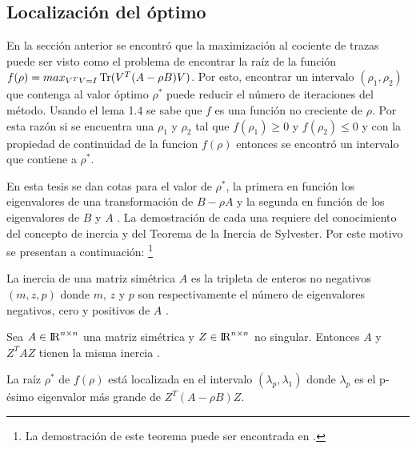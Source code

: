 \subsection{Localización del óptimo}

En la sección anterior se encontró que la maximización al cociente de trazas puede ser visto como el problema de encontrar la raíz de la función $f(\rho) = max_{V^T V= I} \operatorname{Tr}(V^T(A-\rho B)V)$. Por esto, encontrar un intervalo $(\rho_1, \rho_2)$ que contenga al valor óptimo $\rho^*$ puede reducir el número de iteraciones del método. Usando el lema 1.4 se sabe que $f$ es una función no creciente de $\rho$. Por esta razón si se encuentra una $\rho_1$ y $\rho_2$ tal que $f(\rho_1) \geq 0$ y $f(\rho_2) \leq 0$ y con la propiedad de continuidad de la funcion $f(\rho)$ entonces se encontró un intervalo que contiene a $\rho^*$. 

En esta tesis se dan cotas para el valor de $\rho^*$, la primera en función los eigenvalores de una transformación de $B -\rho A$ y la segunda en función de los eigenvalores de $B$ y $A$ \cite{ngo2012trace}. La demostración de cada una requiere del conocimiento del concepto de inercia y del Teorema de la Inercia de Sylvester. Por este motivo se presentan a continuación: \footnote{La demostración de este teorema puede ser encontrada en \cite{golub2012matrix}.}

\begin{definition}
La inercia de una matriz simétrica $A$ es la tripleta de enteros no negativos $(m, z, p)$ donde $m$, $z$ y $p$ son respectivamente el número de eigenvalores negativos, cero y positivos de $A$ \cite{golub2012matrix}.
\end{definition}

\begin{theorem}\label{teorem.2}
Sea $A \in {\rm I\!R}^{n \times n}$ una matriz simétrica y $Z \in {\rm I\!R}^{n \times n}$ no singular. Entonces $A$ y $Z^T A Z$ tienen la misma inercia \cite{golub2012matrix}.
\end{theorem}

\begin{proposition}
La raíz $\rho^*$ de $f(\rho)$ está localizada en el intervalo $(\lambda_p, \lambda_1)$ donde $\lambda_p$ es el p-ésimo eigenvalor más grande de $Z^T(A-\rho B)Z$.
\end{proposition}

